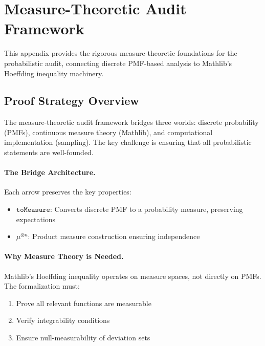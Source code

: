 \section{Measure-Theoretic Audit Framework}
\label{app:measure-audit}

This appendix provides the rigorous measure-theoretic foundations for the probabilistic audit, connecting discrete PMF-based analysis to Mathlib's Hoeffding inequality machinery.

\subsection{Proof Strategy Overview}

The measure-theoretic audit framework bridges three worlds: discrete probability (PMFs), continuous measure theory (Mathlib), and computational implementation (sampling). The key challenge is ensuring that all probabilistic statements are well-founded.

\paragraph{The Bridge Architecture.}
\begin{center}
\end{center}

Each arrow preserves the key properties:
\begin{itemize}
    \item $\texttt{toMeasure}$: Converts discrete PMF to a probability measure, preserving expectations
    \item $\mu^{\otimes n}$: Product measure construction ensuring independence
\end{itemize}

\paragraph{Why Measure Theory is Needed.}
Mathlib's Hoeffding inequality operates on measure spaces, not directly on PMFs. The formalization must:
\begin{enumerate}
    \item Prove all relevant functions are measurable
    \item Verify integrability conditions
    \item Ensure null-measurability of deviation sets
\end{enumerate}

